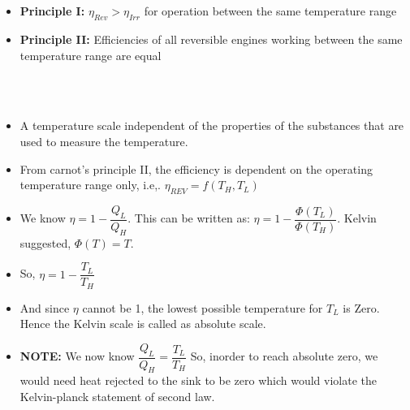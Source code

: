 \documentclass[8pt]{article}
\begin{document}
		\hrulefill\\	%
\\
		\begin{itemize}
			\item \textbf{Principle I:} $\boxed{\eta _{Rev} > \eta _{Irr}}$ for operation between the same temperature range
			\item \textbf{Principle II:} Efficiencies of all reversible engines working between the same temperature range are equal
		\end{itemize}
		\hrulefill\\\pagebreak
\\
		\begin{itemize}
			\item A temperature scale independent of the properties of the substances that are used to measure the temperature. 
			\item From carnot's principle II, the efficiency is dependent on the operating temperature range only, i.e,. $\boxed{\eta _{REV} = f(T_H, T_L)}$
			\item We know $\eta = 1 - \dfrac{Q_L}{Q_H}$. This can be written as: $\eta = 1-\dfrac{\Phi (T_L)}{\Phi (T_H)}$. Kelvin suggested, $\Phi(T)=T$. 
			\item So, $\boxed{\eta = 1-\dfrac{T_L}{T_H}}$
			\item And since $\eta$ cannot be 1, the lowest possible temperature for $T_L$ is Zero. Hence the Kelvin scale is called as absolute scale. 
			\item \textbf{NOTE:} We now know $\boxed{\dfrac{Q_L}{Q_H}=\dfrac{T_L}{T_H}}$ So, inorder to reach absolute zero, we would need heat rejected to the sink to be zero which would violate the Kelvin-planck statement of second law.  
		\end{itemize}
	\hrulefill\\
\\
\end{document}
